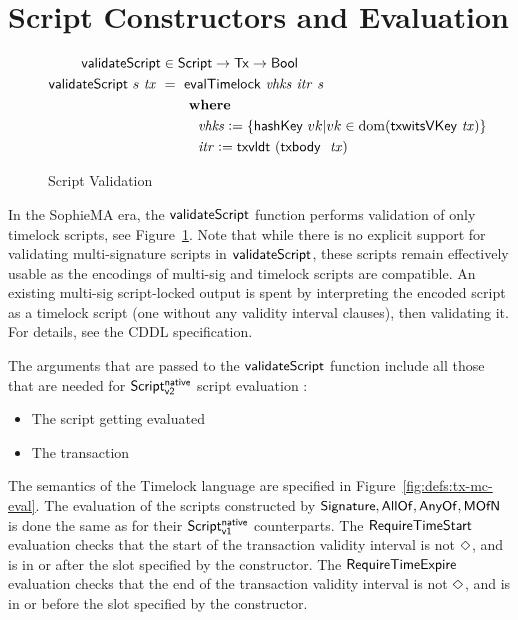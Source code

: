 \section{Script Constructors and Evaluation}
\label{sec:timelock-lang}


\begin{figure}[htb]
  \begin{align*}
    \mathsf{validateScript} & \in\mathsf{Script}\to\mathsf{Tx}\to\mathsf{Bool} \\
    \mathsf{validateScript} ~s~\mathit{tx}~& =~
                             \mathsf{evalTimelock}~\mathit{vhks} ~\mathit{itr}~\mathit{s} \\
                         & ~~~~~ ~ \mathbf{where}~ ~  \\
                         & ~~~~~~~~\mathit{vhks}\mathrel{\mathop:}= \{\mathsf{hashKey}~vk \vert
                           vk \in \operatorname{dom}(\mathsf{txwitsVKey}~\mathit{tx})\} \\
                         & ~~~~~~~~\mathit{itr} \mathrel{\mathop:}= \mathsf{txvldt}~ (\mathsf{txbody}~ \mathit{~} \mathit{tx})
  \end{align*}
  \caption{Script Validation}
  \label{fig:functions-validate}
\end{figure}

In the SophieMA era, the
$\mathsf{validateScript}$ function performs validation of only timelock scripts,
see Figure~\ref{fig:functions-validate}. Note that while there is no explicit
support for validating multi-signature scripts in $\mathsf{validateScript}$,
these scripts remain effectively usable as the encodings of multi-sig and timelock
scripts are compatible. An existing multi-sig script-locked output is
spent by interpreting the encoded script as a timelock script (one without
any validity interval clauses), then validating it. For details, see the CDDL
specification.

The arguments that are passed to the $\mathsf{validateScript}$ function include all those
that are needed for $\mathsf{Script^{native}_{v2}}$ script evaluation :

\begin{itemize}
\item The script getting evaluated
\item The transaction
\end{itemize}

The semantics of the Timelock language are specified in Figure~\ref{fig:defs:tx-mc-eval}.
The evaluation of the scripts constructed by $\mathsf{Signature}, \mathsf{AllOf},
\mathsf{AnyOf}, \mathsf{MOfN}$ is done the same as for their
$\mathsf{Script^{native}_{v1}}$ counterparts. The $\mathsf{RequireTimeStart}$ evaluation
checks that the start of the transaction validity interval is not $\Diamond$, and is in or after
the slot specified by the constructor. The $\mathsf{RequireTimeExpire}$ evaluation
checks that the end of the transaction validity interval is not $\Diamond$, and is in or before
the slot specified by the constructor.

